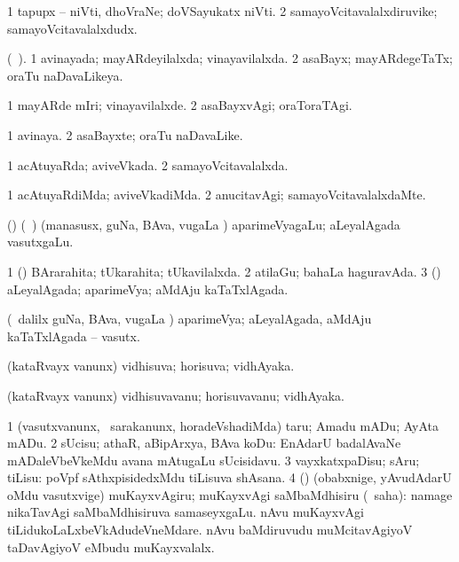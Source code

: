 \bentry
{}
\gl{\nA}
\bmng
\bnum
\num{1} tapupx -- niVti, dhoVraNe; doVSayukatx niVti. 
\num{2} samayoVcitavalalxdiruvike; samayoVcitavalalxdudx. 
\enum
\emng
\eentry

\bentry
{}
\gl{\gu}
\bmng
(\tama\ ). 
\bnum
\num{1} avinayada; mayARdeyilalxda; vinayavilalxda. 
\num{2} asaBayx; mayARdegeTaTx; oraTu naDavaLikeya. 
\enum
\emng
\eentry

\bentry
{}
\gl{\kirxvi}
\bmng
\bnum
\num{1} mayARde mIri; vinayavilalxde. 
\num{2} asaBayxvAgi; oraToraTAgi. 
\enum
\emng
\eentry

\bentry
{}
\gl{\nA}
\bmng
\bnum
\num{1} avinaya. 
\num{2} asaBayxte; oraTu naDavaLike. 
\enum
\emng
\eentry

\bentry
{}
\gl{\gu}
\bmng
\bnum
\num{1} acAtuyaRda; aviveVkada. 
\num{2} samayoVcitavalalxda. 
\enum
\emng
\eentry

\bentry
{}
\gl{\kirxvi}
\bmng
\bnum
\num{1} acAtuyaRdiMda; aviveVkadiMda. 
\num{2} anucitavAgi; samayoVcitavalalxdaMte. 
\enum
\emng
\eentry

\bentry
{}
\gl{\nA}
\bmng
(\bava) (\kanmu\ \rUpa) (manasusx, guNa, BAva, \mo vugaLa \vi) aparimeVyagaLu; aLeyalAgada vasutxgaLu. 
\emng
\eentry

\bentry
{}
\gl{\gu}
\bmng
\bnum
\num{1} (\Bwvi) BArarahita; tUkarahita; tUkavilalxda. 
\num{2} atilaGu; bahaLa haguravAda. 
\num{3} (\rUpa) aLeyalAgada; aparimeVya; aMdAju kaTaTxlAgada. 
\enum
\emng
\eentry

\bentry
{}
\gl{\nA}
\bmng
(\kanmu\ \bava dalilx guNa, BAva, \mo vugaLa \vi) aparimeVya; aLeyalAgada, aMdAju kaTaTxlAgada -- vasutx. 
\emng
\eentry

\bentry
{}
\gl{\gu}
\bmng
(kataRvayx \mo vanunx) vidhisuva; horisuva; vidhAyaka. 
\emng
\eentry

\bentry
{}
\gl{\nA}
\bmng
(kataRvayx \mo vanunx) vidhisuvavanu; horisuvavanu; vidhAyaka. 
\emng
\eentry

\bentry
{}
\gl{\sakirx}
\bmng
\bnum
\num{1} (vasutxvanunx, \kanmu\ sarakanunx, horadeVshadiMda) taru; Amadu mADu; AyAta mADu. 
\num{2} sUcisu; athaR, aBipArxya, BAva koDu:  EnAdarU badalAvaNe mADaleVbeVkeMdu avana mAtugaLu sUcisidavu. 
\num{3} vayxkatxpaDisu; sAru; tiLisu:  poVpf sAthxpisidedxMdu tiLisuva shAsana. 
\num{4} (\pArxparx) (obabxnige, yAvudAdarU oMdu vasutxvige) muKayxvAgiru; muKayxvAgi saMbaMdhisiru (\akirx\ saha):  namage nikaTavAgi saMbaMdhisiruva samaseyxgaLu.  nAvu muKayxvAgi tiLidukoLaLxbeVkAdudeVneMdare.  nAvu baMdiruvudu muMcitavAgiyoV taDavAgiyoV eMbudu muKayxvalalx. 
\enum
\emng
\eentry

